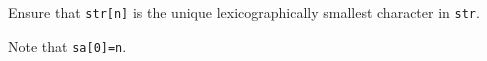 Ensure that \texttt{str[n]} is the unique lexicographically smallest character in \texttt{str}.

Note that \texttt{sa[0]=n}.


